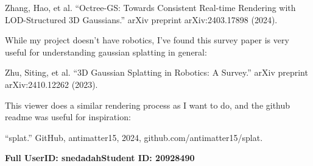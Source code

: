 \documentclass {article}
\begin{document}
     Zhang, Hao, et al. “Octree-GS: Towards Consistent Real-time Rendering with LOD-Structured 3D Gaussians.” arXiv preprint arXiv:2403.17898 (2024).


     While my project doesn't have robotics, I've found this survey paper is very useful for understanding gaussian splatting in general:

     Zhu, Siting, et al. “3D Gaussian Splatting in Robotics: A Survey.” arXiv preprint arXiv:2410.12262 (2023).

     This viewer does a similar rendering process as I want to do, and the github readme was useful for inspiration:

     “splat.” GitHub, antimatter15, 2024, github.com/antimatter15/splat.

\newpage



{\hfill{\bf Full UserID: snedadah}\hfill{\bf Student ID: 20928490}\hfill}
\end{document}
